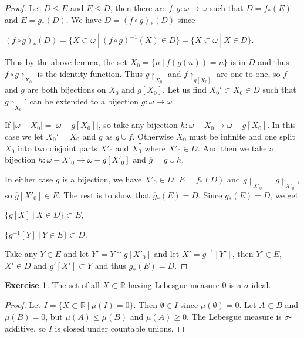 \documentclass[8pt]{article}
\theoremstyle{definition}
\theoremstyle{definition}
\theoremstyle{definition}
\theoremstyle{definition}
\theoremstyle{definition}
\theoremstyle{definition}
\theoremstyle{definition}
\theoremstyle{definition}
\theoremstyle{definition}
\theoremstyle{definition}
\theoremstyle{definition}
\theoremstyle{definition}
\theoremstyle{definition}
\newtheorem{exercise}{Exercise}[section]
\theoremstyle{definition}
\theoremstyle{question}
\begin{document}
\begin{proof} Let $D \leq E$ and $E \leq D$, then
  there are $f, g : \omega \to \omega$ such that $D = f_*(E)$ and $E = g_*(D)$. We have
  $D = (f \circ g)_*(D)$ since
  \begin{center}
    $(f \circ g)_*(D) = \{ X \subset \omega \: | \: (f \circ g)^{-1}(X) \in D \} = \{ X \subset \omega \: | \: X \in D \}$.
  \end{center}
  Thus by the above lemma, the set $X_0 = \{ n \: | \: f(g(n)) = n \}$ is in $D$ and thus 
  $f \circ g\upharpoonright_{X_0}$ is the identity function. Thus $g\upharpoonright_{X_0}$ and 
  $f\upharpoonright_{g[X_0]}$ are one-to-one, so $f$ and $g$ are both bijections on $X_0$ and $g[X_0]$.
  Let us find $X_0' \subset X_0 \in D$ such that $g\upharpoonright_{X_0}'$ 
  can be extended to a bijection $\overline{g} : \omega \to \omega$.

  If $|\omega - X_0| = |\omega - g[X_0]|$, so take any bijection $h : \omega - X_0 \to \omega - g[X_0]$. In this case
  we let $X_0' = X_0$ and $\overline{g}$ as $g \cup f$.
  Otherwise $X_0$ must be infinite and one split $X_0$ into two disjoint parts $X'_0$ and $X^{''}_0$ where 
  $X'_0 \in D$. And then we take a bijection $h : \omega - X'_0 \to \omega - g[X'_0]$ and $\overline{g} = g \cup h$.

  In either case $\overline{g}$ is a bijection, we have $X'_0 \in D$, $E = f_*(D)$ and 
  $g\upharpoonright_{X'_0} = \overline{g}\upharpoonright_{X'_0}$, 
  so $\overline{g}[X'_0] \in E$. The rest is to show that $\overline{g}_*(E) = D$. Since
  $g_*(E) = D$, we get
  \begin{center}
    $\{ g[X] \: | \: X \in D \} \subset E$,

    $\{ g^{-1}[Y] \: | \: Y \in E \} \subset D$.
  \end{center}

  Take any $Y \in E$ and let $Y' = Y \cap \overline{g}[X'_0]$ and let $X' = \overline{g}^{-1}[Y']$, 
  then $Y' \in E$, $X' \in D$ and $g'[X'] \subset Y$ and thus $\overline{g}_*(E) = D$.
\end{proof}


\begin{exercise}
  The set of all $X \subset \mathbb{R}$ having Lebesgue measure $0$ is a $\sigma$-ideal.
\end{exercise}

\begin{proof}
  Let $I = \{ X \subset \mathbb{R} \: | \: \mu(I) = 0 \}$.
  Then $\emptyset \in I$ since $\mu(\emptyset) = 0$.
  Let $A \subset B$ and $\mu(B) = 0$, but $\mu(A) \leq \mu(B)$ and $\mu(A) \geq 0$.
  The Lebesgue measure is $\sigma$-additive, so $I$ is closed under countable unions.
\end{proof}
\end{document}
